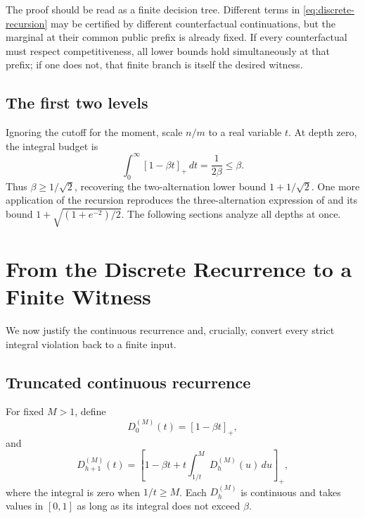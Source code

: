 \documentclass[11pt,letterpaper]{article}
\newcommand{\cref}[1]{\autoref{#1}}
\theoremstyle{definition}
\theoremstyle{remark}
\newcommand{\pos}[1]{\left[#1\right]_{+}}
\begin{document}
The proof should be read as a finite decision tree.
Different terms in \cref{eq:discrete-recursion} may be certified by different counterfactual continuations, but the marginal at their common public prefix is already fixed.
If every counterfactual must respect competitiveness, all lower bounds hold simultaneously at that prefix; if one does not, that finite branch is itself the desired witness.

\subsection{The first two levels}

Ignoring the cutoff for the moment, scale $n/m$ to a real variable $t$.
At depth zero, the integral budget is
\begin{equation}\label{eq:depth-zero} \int_0^{\infty}\pos{1-\beta t}\,dt=\frac{1}{2\beta}\le\beta. \end{equation}
Thus $\beta\ge1/\sqrt2$, recovering the two-alternation lower bound $1+1/\sqrt2$.
One more application of the recursion reproduces the three-alternation expression of \citet{WangWong2015} and its bound $1+\sqrt{(1+e^{-2})/2}$.
The following sections analyze all depths at once.

\section{From the Discrete Recurrence to a Finite Witness}\label{sec:bridge}

We now justify the continuous recurrence and, crucially, convert every strict integral violation back to a finite input.

\subsection{Truncated continuous recurrence}

For fixed $M>1$, define
\begin{equation}\label{eq:continuous-truncated-base} D_0^{(M)}(t)=\pos{1-\beta t}, \end{equation}
and
\begin{equation}\label{eq:continuous-truncated-recursion} D_{h+1}^{(M)}(t)=\pos{1-\beta t+t\int_{1/t}^{M}D_h^{(M)}(u)\,du}, \end{equation}
where the integral is zero when $1/t\ge M$.
Each $D_h^{(M)}$ is continuous and takes values in $[0,1]$ as long as its integral does not exceed $\beta$.
\end{document}
